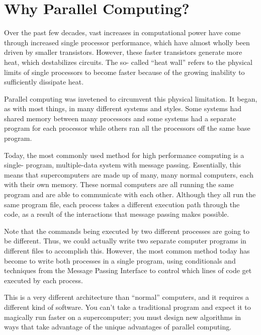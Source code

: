 \label{lab:MPI_Intro}

\section*{Why Parallel Computing?} Over the past few decades, vast increases in
computational power have come through increased single processor performance,
which have almost wholly been driven by smaller transistors. However, these
faster transistors generate more heat, which destabilizes circuits. The so-
called ``heat wall'' refers to the physical limits of single processors to
become faster because of the growing inability to sufficiently dissipate heat.

Parallel computing was invetened to circumvent this physical limitation. It
began, as with most things, in many different systems and styles. Some systems
had shared memory between many processors and some systems had a separate
program for each processor while others ran all the processors off the same base
program.

Today, the most commonly used method for high performance computing is a single-
program, multiple-data system with message passing. Essentially, this means that
supercomputers are made up of many, many normal computers, each with their own
memory. These normal computers are all running the same program and are able to
communicate with each other. Although they all run the same program file, each
process takes a different execution path through the code, as a result of the
interactions that message passing makes possible.

Note that the commands being executed by two different processes are going to be
different. Thus, we could actually write two separate computer programs in
different files to accomplish this. However, the most common method today has
become to write both processes in a single program, using conditionals and
techniques from the Message Passing Interface to control which lines of code get
executed by each process.

This is a very different architecture than ``normal'' computers, and it requires
a different kind of software. You can't take a traditional program and expect it
to magically run faster on a supercomputer; you must design new algorithms in
ways that take advantage of the unique advantages of parallel computing.

